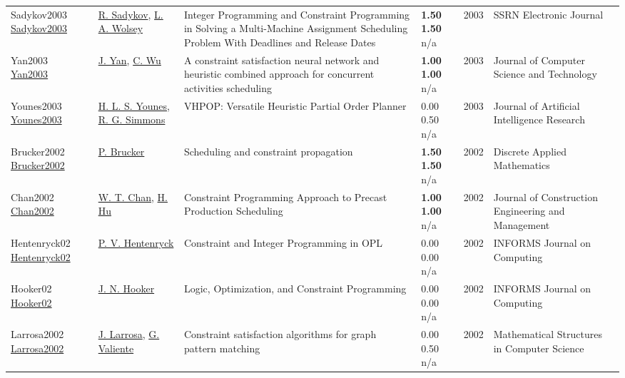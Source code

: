 {\begin{longtable}{p{3cm}p{5cm}p{10cm}p{1cm}rp{2.5cm}l}
Sadykov2003 \href{http://dx.doi.org/10.2139/ssrn.988640}{Sadykov2003} & \hyperref[auth:a384]{R. Sadykov}, \hyperref[auth:a224]{L. A. Wolsey} & Integer Programming and Constraint Programming in Solving a Multi-Machine Assignment Scheduling Problem With Deadlines and Release Dates & \noindent{}\textbf{1.50} \textbf{1.50} n/a & 2003 & SSRN Electronic Journal & \cite{Sadykov2003}\\
Yan2003 \href{http://dx.doi.org/10.1007/bf02948893}{Yan2003} & \hyperref[auth:a2033]{J. Yan}, \hyperref[auth:a2034]{C. Wu} & A constraint satisfaction neural network and heuristic combined approach for concurrent activities scheduling & \noindent{}\textbf{1.00} \textbf{1.00} n/a & 2003 & Journal of Computer Science and Technology & \cite{Yan2003}\\
Younes2003 \href{http://dx.doi.org/10.1613/jair.1136}{Younes2003} & \hyperref[auth:a1844]{H. L. S. Younes}, \hyperref[auth:a1845]{R. G. Simmons} & \cellcolor{gold!20}VHPOP: Versatile Heuristic Partial Order Planner & \noindent{}\textcolor{black!50}{0.00} 0.50 n/a & 2003 & Journal of Artificial Intelligence Research & \cite{Younes2003}\\
Brucker2002 \href{http://dx.doi.org/10.1016/s0166-218x(01)00342-0}{Brucker2002} & \hyperref[auth:a847]{P. Brucker} & \cellcolor{gold!20}Scheduling and constraint propagation & \noindent{}\textbf{1.50} \textbf{1.50} n/a & 2002 & Discrete Applied Mathematics & \cite{Brucker2002}\\
Chan2002 \href{http://dx.doi.org/10.1061/(asce)0733-9364(2002)128:6(513)}{Chan2002} & \hyperref[auth:a1662]{W. T. Chan}, \hyperref[auth:a1663]{H. Hu} & Constraint Programming Approach to Precast Production Scheduling & \noindent{}\textbf{1.00} \textbf{1.00} n/a & 2002 & Journal of Construction Engineering and Management & \cite{Chan2002}\\
Hentenryck02 \href{http://dx.doi.org/10.1287/ijoc.14.4.345.2826}{Hentenryck02} & \hyperref[auth:a148]{P. V. Hentenryck} & Constraint and Integer Programming in OPL & \noindent{}\textcolor{black!50}{0.00} \textcolor{black!50}{0.00} n/a & 2002 & \cellcolor{red!20}INFORMS Journal on Computing & \cite{Hentenryck02}\\
Hooker02 \href{http://dx.doi.org/10.1287/ijoc.14.4.295.2828}{Hooker02} & \hyperref[auth:a160]{J. N. Hooker} & Logic, Optimization, and Constraint Programming & \noindent{}\textcolor{black!50}{0.00} \textcolor{black!50}{0.00} n/a & 2002 & \cellcolor{red!20}INFORMS Journal on Computing & \cite{Hooker02}\\
Larrosa2002 \href{http://dx.doi.org/10.1017/s0960129501003577}{Larrosa2002} & \hyperref[auth:a1794]{J. Larrosa}, \hyperref[auth:a1854]{G. Valiente} & Constraint satisfaction algorithms for graph  pattern matching & \noindent{}\textcolor{black!50}{0.00} 0.50 n/a & 2002 & Mathematical Structures in Computer Science & \cite{Larrosa2002}\\

\end{longtable}}
